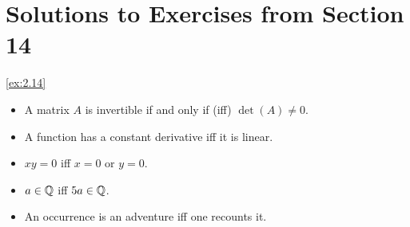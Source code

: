 \section*{Solutions to Exercises from Section 14}
\begin{solution}\label{sol:2.14}\ref{ex:2.14}
    \begin{itemize}
        \item A matrix $A$ is invertible if and only if (iff) $\det(A)\ne 0$.
        \item A function has a constant derivative iff it is linear. 
        \item $xy=0$ iff $x=0$ or $y=0$. 
        \item $a\in\mathbb{Q}$ iff $5a\in\mathbb{Q}$. 
        \item An occurrence is an adventure iff one recounts it.
    \end{itemize}
\end{solution}